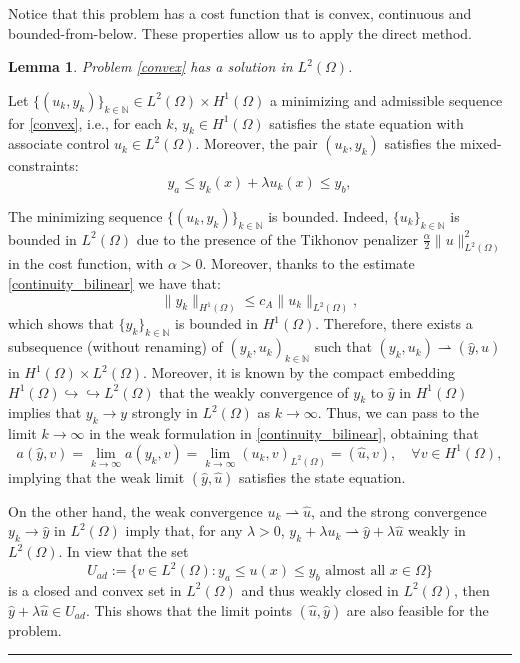 \documentclass[11pt,a4paper]{amsart}
\newcommand{\kw}{\rule{2mm}{2mm}}
\newcommand{\om}{\Omega}
\renewenvironment{proof}{{Proof.}}{\hfill\kw}
\newtheorem{lemma}{{Lemma}}
\newcommand{\norm}[1]{\lVert #1 \rVert}
\begin{document}
   
Notice that this problem has a  cost function that is convex, continuous and bounded-from-below. These properties allow us to apply the direct method.
\begin{lemma}
       Problem \eqref{convex} has a solution in $L^2(\om)$.
   \end{lemma}
   \begin{proof}
       Let $\{(u_k,y_k)\}_{k\in \mathbb{N}}\in L^2(\Omega)\times H^1(\Omega)$ a minimizing and admissible sequence for \eqref{convex}, i.e., for each $k$, $y_k \in H^1(\Omega)$ satisfies the state equation with associate control $u_k \in L^2(\om)$. Moreover, the pair $(u_k,y_k)$ satisfies the mixed-constraints:
    \[
    y_a\le y_k(x)+\lambda u_{k}(x)\le y_b,
    \]

The minimizing sequence $\{(u_k,y_k)\}_{k\in \mathbb{N}}$ is bounded. Indeed, $\{u_k\}_{k\in \mathbb{N}}$ is bounded in $L^2(\Omega)$  due to the presence of the Tikhonov penalizer $\frac{\alpha}{2}\|u\|_{L^2(\Omega)}^2$ in the cost function, with $\alpha>0$. Moreover, thanks to the estimate \eqref{continuity_bilinear} we have that: $$ \norm{y_k}_{H^1(\Omega)}\leq c_A \norm{u_k}_{L^2(\Omega)},$$
which shows that $\{y_k\}_{k\in \mathbb{N}}$ is bounded in $H^1(\om)$. %
Therefore, there exists  a subsequence (without renaming) of $(y_k,u_k)_{k\in\mathbb{N}}$  such that $(y_{k},u_{k})\rightharpoonup (\hat{y},\hat{u})$ in $H^1(\Omega)\times L^2(\Omega)$. Moreover, it is known by the compact embedding $H^1(\Omega) \hookrightarrow \hookrightarrow L^2(\Omega)$ that the weakly convergence of $y_k$ to $\hat{y}$ in $H^1(\Omega)$ implies that $y_{k}\to y$ strongly in $L^2(\Omega)$ as $k\to \infty$. Thus,  we can pass to the limit $k\to \infty$ in the weak formulation in \eqref{continuity_bilinear}, obtaining that
    \[
        a(\hat y, v)=\lim_{k\to\infty}a(y_k,v) = \lim_{k\to\infty}(u_k,v)_{L^2(\Omega)}=(\hat u,v),\quad \forall v \in H^1(\Omega),
    \]
implying that the weak limit $(\hat y,\hat u)$ satisfies the state equation. 

On the other hand, the weak convergence  $u_k \rightharpoonup \hat u$, and the strong convergence $y_k \to \hat y$ in $L^2(\Omega)$ imply that, for any $\lambda>0$, $y_k+\lambda u_k\rightharpoonup \hat{y}+\lambda\hat{u}$ weakly in $L^2(\om)$. In view that 
 the set 
\[
    U_{ad}:=\{v\in L^2(\om ):y_a\le u(x)\le y_b \mbox{ almost all }x\in \om\}
\]
is a closed and convex set in $ L^2(\Omega)$ and thus weakly closed in $L^2(\om)$, then $\hat{y}+\lambda\hat{u}\in U_{ad}$. This shows that the limit points $(\hat{u},\hat{y})$ are also feasible for the problem. 


\end{proof}
\end{document}

